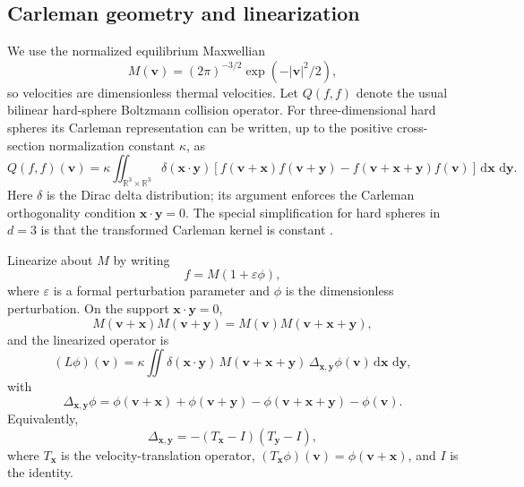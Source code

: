 \documentclass[11pt]{article}
\numberwithin{equation}{section}
\newcommand{\R}{\mathbb R}
\newcommand{\dd}{\,\mathrm d}
\theoremstyle{definition}
\begin{document}
\subsection{Carleman geometry and linearization}

We use the normalized equilibrium Maxwellian
\begin{equation}
 M(\bm v)=(2\pi)^{-3/2}\exp(-|\bm v|^2/2),
 \label{eq:Maxwellian_main}
\end{equation}
so velocities are dimensionless thermal velocities.  Let $Q(f,f)$ denote the
usual bilinear hard-sphere Boltzmann collision operator.  For three-dimensional
hard spheres its Carleman representation can be written, up to the positive
cross-section normalization constant $\kappa$, as
\begin{equation}
 Q(f,f)(\bm v)
 =
 \kappa
 \iint_{\R^3\times\R^3}
 \delta(\bm x\cdot\bm y)
 \left[
 f(\bm v+\bm x)f(\bm v+\bm y)
 -
 f(\bm v+\bm x+\bm y)f(\bm v)
 \right]
 \dd\bm x\,\dd\bm y .
 \label{eq:carleman}
\end{equation}
Here $\delta$ is the Dirac delta distribution; its argument enforces the
Carleman orthogonality condition $\bm x\cdot\bm y=0$.  The special
simplification for hard spheres in $d=3$ is that the transformed Carleman
kernel is constant \cite{MouhotPareschi2006}.

Linearize about $M$ by writing
\begin{equation}
 f=M(1+\varepsilon\phi),
\end{equation}
where $\varepsilon$ is a formal perturbation parameter and $\phi$ is the
dimensionless perturbation.
On the support $\bm x\cdot\bm y=0$,
\begin{equation}
 M(\bm v+\bm x)M(\bm v+\bm y)
 =
 M(\bm v)M(\bm v+\bm x+\bm y),
\end{equation}
and the linearized operator is
\begin{equation}
 (L\phi)(\bm v)
 =
 \kappa
 \iint
 \delta(\bm x\cdot\bm y)\,
 M(\bm v+\bm x+\bm y)\,
 \Delta_{\bm x,\bm y}\phi(\bm v)
 \dd\bm x\,\dd\bm y ,
 \label{eq:linearized}
\end{equation}
with
\begin{equation}
 \Delta_{\bm x,\bm y}\phi
 =
 \phi(\bm v+\bm x)+\phi(\bm v+\bm y)
 -\phi(\bm v+\bm x+\bm y)-\phi(\bm v).
 \label{eq:collision_difference}
\end{equation}
Equivalently,
\begin{equation}
 \Delta_{\bm x,\bm y}
 =-(T_{\bm x}-I)(T_{\bm y}-I),
 \label{eq:delta_translation}
\end{equation}
where $T_{\bm x}$ is the velocity-translation operator,
$(T_{\bm x}\phi)(\bm v)=\phi(\bm v+\bm x)$, and $I$ is the identity.
\end{document}
